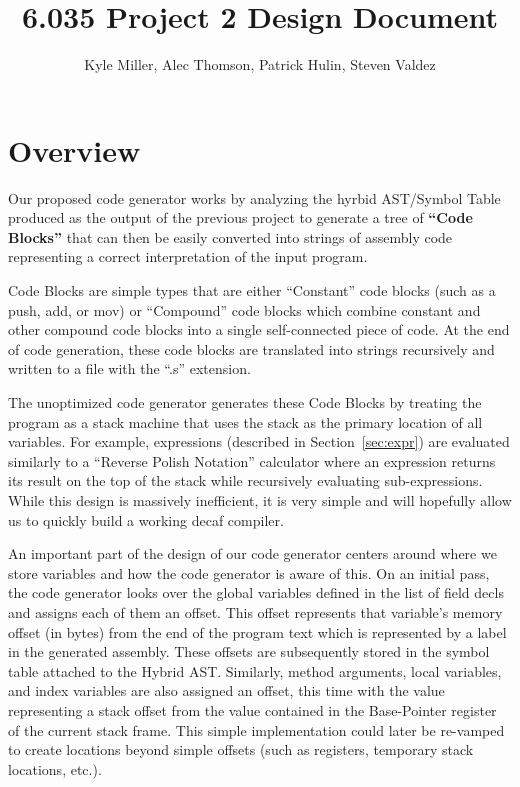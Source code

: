\documentclass[11pt]{article}
\title{6.035 Project 2 Design Document}
\author{Kyle Miller, Alec Thomson, Patrick Hulin, Steven Valdez}
\begin{document}
\maketitle

\section{Overview}

Our proposed code generator works by analyzing the hyrbid AST/Symbol Table produced as the output of the previous project to generate a tree of \textbf{``Code Blocks''} that can then be easily converted into strings of assembly code representing a correct interpretation of the input program. 

Code Blocks are simple types that are either ``Constant'' code blocks (such as a push, add, or mov) or ``Compound'' code blocks which combine constant and other compound code blocks into a single self-connected piece of code. At the end of code generation, these code blocks are translated into strings recursively and written to a file with the ``.s'' extension. 

The unoptimized code generator generates these Code Blocks by treating the program as a stack machine that uses the stack as the primary location of all variables. For example, expressions (described in Section~\ref{sec:expr}) are evaluated similarly to a ``Reverse Polish Notation'' calculator where an expression returns its result on the top of the stack while recursively  evaluating sub-expressions. While this design is massively inefficient, it is very simple and will hopefully allow us to quickly build a working decaf compiler. 

An important part of the design of our code generator centers around where we store variables and how the code generator is aware of this. On an initial pass, the code generator looks over the global variables defined in the list of field decls and assigns each of them an offset. This offset represents that variable's memory offset (in bytes) from the end of the program text which is represented by a label in the generated assembly. These offsets are subsequently stored in the symbol table attached to the Hybrid AST. Similarly, method arguments, local variables, and index variables are also assigned an offset, this time with the value representing a stack offset from the value contained in the Base-Pointer register of the current stack frame. This simple implementation could later be re-vamped to create locations beyond simple offsets (such as registers, temporary stack locations, etc.). 
\end{document}
